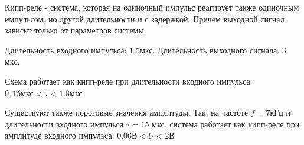 \documentclass[a4paper,14pt]{extarticle}
\begin{document}
Кипп-реле - система, которая на одиночный импульс реагирует также одиночным импульсом, но другой длительности и с задержкой. Причем выходной сигнал зависит только от параметров системы.

Длительность входного импульса: $1.5$мкс. Длительность выходного сигнала: $3$ мкс.


Схема работает как кипп-реле при длительности входного импульса: $0,15 \text{мкс}<\tau<1.8 \text{мкс}$

Существуют также пороговые значения амплитуды. Так, на частоте $f = 7$кГц и длительности входного импульса $\tau = 15$ мкс, система работает как кипп-реле при амплитуде входного импульса: $0.06 \text{В}<U<2\text{В}$
\end{document}
